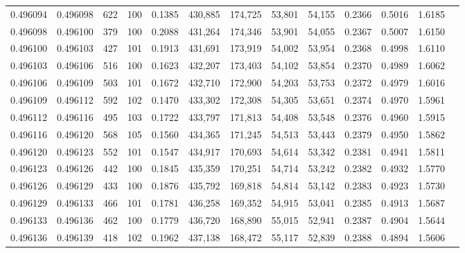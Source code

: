 \begin{tabular}{rrrrrrrrrrrrr}
0.496094 & 0.496098 &   622 & 100 &                                     0.1385 & 430,885 & 174,725 &  53,801 &  54,155 & 0.2366 & 0.5016 & 1.6185 \\
0.496098 & 0.496100 &   379 & 100 &                                     0.2088 & 431,264 & 174,346 &  53,901 &  54,055 & 0.2367 & 0.5007 & 1.6150 \\
0.496100 & 0.496103 &   427 & 101 &                                     0.1913 & 431,691 & 173,919 &  54,002 &  53,954 & 0.2368 & 0.4998 & 1.6110 \\
0.496103 & 0.496106 &   516 & 100 &                                     0.1623 & 432,207 & 173,403 &  54,102 &  53,854 & 0.2370 & 0.4989 & 1.6062 \\
0.496106 & 0.496109 &   503 & 101 &                                     0.1672 & 432,710 & 172,900 &  54,203 &  53,753 & 0.2372 & 0.4979 & 1.6016 \\
0.496109 & 0.496112 &   592 & 102 &                                     0.1470 & 433,302 & 172,308 &  54,305 &  53,651 & 0.2374 & 0.4970 & 1.5961 \\
0.496112 & 0.496116 &   495 & 103 &                                     0.1722 & 433,797 & 171,813 &  54,408 &  53,548 & 0.2376 & 0.4960 & 1.5915 \\
0.496116 & 0.496120 &   568 & 105 &                                     0.1560 & 434,365 & 171,245 &  54,513 &  53,443 & 0.2379 & 0.4950 & 1.5862 \\
0.496120 & 0.496123 &   552 & 101 &                                     0.1547 & 434,917 & 170,693 &  54,614 &  53,342 & 0.2381 & 0.4941 & 1.5811 \\
0.496123 & 0.496126 &   442 & 100 &                                     0.1845 & 435,359 & 170,251 &  54,714 &  53,242 & 0.2382 & 0.4932 & 1.5770 \\
0.496126 & 0.496129 &   433 & 100 &                                     0.1876 & 435,792 & 169,818 &  54,814 &  53,142 & 0.2383 & 0.4923 & 1.5730 \\
0.496129 & 0.496133 &   466 & 101 &                                     0.1781 & 436,258 & 169,352 &  54,915 &  53,041 & 0.2385 & 0.4913 & 1.5687 \\
0.496133 & 0.496136 &   462 & 100 &                                     0.1779 & 436,720 & 168,890 &  55,015 &  52,941 & 0.2387 & 0.4904 & 1.5644 \\
0.496136 & 0.496139 &   418 & 102 &                                     0.1962 & 437,138 & 168,472 &  55,117 &  52,839 & 0.2388 & 0.4894 & 1.5606 \\

\end{tabular}
